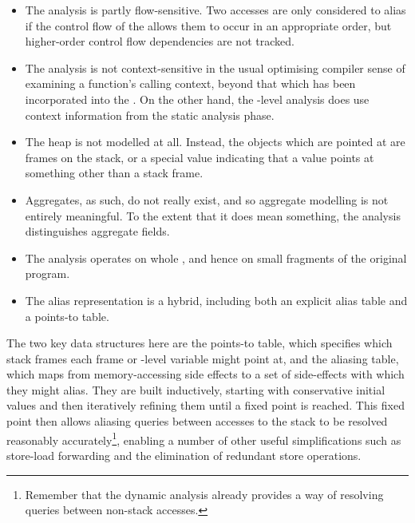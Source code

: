 \begin{itemize}
\item
  The analysis is partly flow-sensitive.  Two accesses are only
  considered to alias if the control flow of the {\StateMachine}
  allows them to occur in an appropriate order, but higher-order
  control flow dependencies are not tracked.  
\item
  The analysis is not context-sensitive in the usual optimising
  compiler sense of examining a function's calling context, beyond
  that which has been incorporated into the {\StateMachine}.  On the
  other hand, the {\StateMachine}-level analysis does use context
  information from the static analysis phase.
\item
  The heap is not modelled at all.  Instead, the objects which are
  pointed at are frames on the stack, or a special value indicating
  that a value points at something other than a stack frame.
\item
  Aggregates, as such, do not really exist, and so aggregate modelling
  is not entirely meaningful.  To the extent that it does mean
  something, the analysis distinguishes aggregate fields.
\item
  The analysis operates on whole {\StateMachines}, and hence on small
  fragments of the original program.
\item
  The alias representation is a hybrid, including both an explicit
  alias table and a points-to table. 
\end{itemize}


The two key data structures here are the points-to table, which
specifies which stack frames each frame or {\StateMachine}-level
variable might point at, and the aliasing table, which maps from
memory-accessing side effects to a set of side-effects with which they
might alias.  They are built inductively, starting with
conservative initial values
and then iteratively refining them until a fixed point is reached.
This fixed point then allows aliasing queries between accesses to the
stack to be resolved reasonably accurately\footnote{Remember that the
  dynamic analysis already provides a way of resolving queries between
  non-stack accesses.}, enabling a number of other useful
simplifications such as store-load forwarding and the elimination of
redundant store operations.

